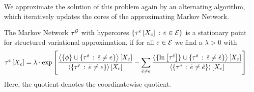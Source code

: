 We approximate the solution of this problem again by an alternating algorithm, which iteratively updates the cores of the approximating Markov Network.

\begin{theorem}
    \label{the:updateEquationStructuredVariational}
    The Markov Network $\tau^{\mathcal{G}}$ with hypercores $\left\{\tau^{e}\left[X_{e}\right]\,:\,e\in\mathcal{E}\right\}$ is a stationary point for structured variational approximation, if for all $e\in\mathcal{E}$ we find a $\lambda>0$ with
    \begin{align*}
        \tau^{e}\left[X_{e}\right]
        = \lambda\cdot \mathrm{exp}\left[
            \frac{
                \left\langle \{\phi\}\cup\{
                \tau^{\tilde{e}}\,:\,\tilde{e}\neq e
                \}\right\rangle \left[ X_{e} \right]
            }{
                \left\langle \{
                \tau^{\tilde{e}}\,:\,\tilde{e}\neq e
                \}\right\rangle \left[ X_{e} \right]
            }
            - \sum_{\hat{e}\neq e}
            \frac{
                \left\langle \{\ln \left[ \tau^{\hat{e}} \right]\}\cup\{
                \tau^{\tilde{e}}\,:\,\tilde{e}\neq\hat{e}
                \}\right\rangle \left[ X_{e} \right]
            }{
                \left\langle \{
                \tau^{\tilde{e}}\,:\,\tilde{e}\neq\hat{e}
                \}\right\rangle \left[ X_{e} \right]
            }
        \right] \, .
    \end{align*}
    Here, the quotient denotes the coordinatewise quotient.
\end{theorem}
